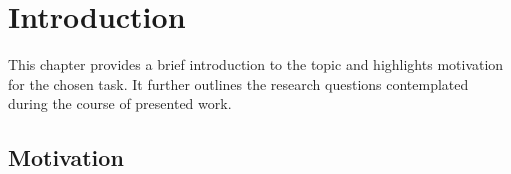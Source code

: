
\chapter{Introduction}
\label{sec:introduction}


This chapter provides a brief introduction to the topic and highlights motivation for the chosen task. It further outlines the research questions contemplated
 during the course of presented work.


\section{Motivation}

